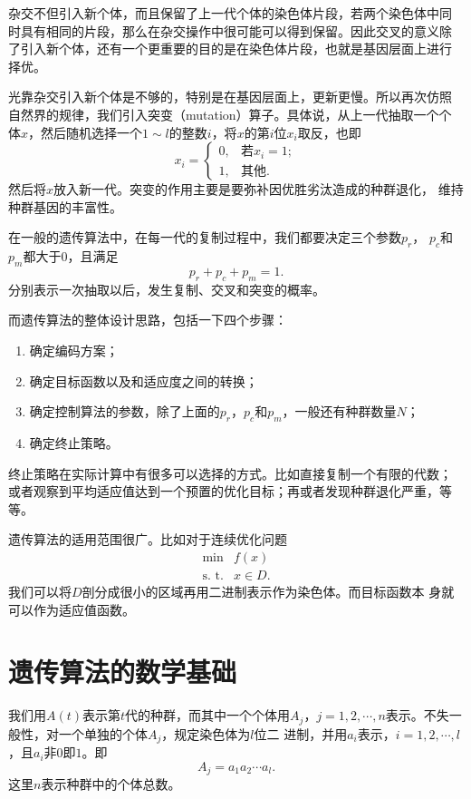 杂交不但引入新个体，而且保留了上一代个体的染色体片段，若两个染色体中同
时具有相同的片段，那么在杂交操作中很可能可以得到保留。因此交叉的意义除
了引入新个体，还有一个更重要的目的是在染色体片段，也就是基因层面上进行
择优。

光靠杂交引入新个体是不够的，特别是在基因层面上，更新更慢。所以再次仿照
自然界的规律，我们引入突变（mutation）算子。具体说，从上一代抽取一个个
体$x$，然后随机选择一个$1 \sim l$的整数$i$，将$x$的第$i$位$x_i$取反，也即
$$
x_i = \left\{
\begin{array}{ll}
  0,& \mbox{若} x_i = 1; \\
  1,& \mbox{其他}.
\end{array}
\right.
$$
然后将$x$放入新一代。突变的作用主要是要弥补因优胜劣汰造成的种群退化，
维持种群基因的丰富性。

在一般的遗传算法中，在每一代的复制过程中，我们都要决定三个参数$p_r$，
$p_c$和$p_m$都大于$0$，且满足
$$
p_r + p_c + p_m = 1. 
$$
分别表示一次抽取以后，发生复制、交叉和突变的概率。

而遗传算法的整体设计思路，包括一下四个步骤：
\begin{enumerate}
\item 确定编码方案；
\item 确定目标函数以及和适应度之间的转换；
\item 确定控制算法的参数，除了上面的$p_r$，$p_c$和$p_m$，一般还有种群数量$N$；
\item 确定终止策略。
\end{enumerate}

终止策略在实际计算中有很多可以选择的方式。比如直接复制一个有限的代数；
或者观察到平均适应值达到一个预置的优化目标；再或者发现种群退化严重，等
等。

遗传算法的适用范围很广。比如对于连续优化问题
$$
\begin{array}{ll}
  \min & f(x) \\
  \mbox{s. t.}& x \in D.
\end{array}
$$
我们可以将$D$剖分成很小的区域再用二进制表示作为染色体。而目标函数本
身就可以作为适应值函数。

\section{遗传算法的数学基础}

我们用$A(t)$表示第$t$代的种群，而其中一个个体用$A_j$，$j = 1, 2,
\cdots, n$表示。不失一般性，对一个单独的个体$A_j$，规定染色体为$l$位二
进制，并用$a_i$表示，$i = 1, 2, \cdots, l$，且$a_i$非$0$即$1$。即
$$
A_j = a_1a_2\cdots a_l.
$$
这里$n$表示种群中的个体总数。

